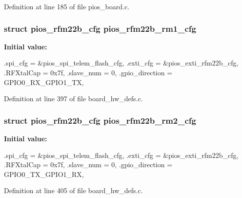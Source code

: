 \-Definition at line 185 of file pios\-\_\-board.\-c.

\hypertarget{group___revo_mini_ga74080000cc730f990607c938f6984f3e}{
\subsubsection[{pios\-\_\-rfm22b\-\_\-rm1\-\_\-cfg}]{\setlength{\rightskip}{0pt plus 5cm}struct {\bf pios\-\_\-rfm22b\-\_\-cfg} {\bf pios\-\_\-rfm22b\-\_\-rm1\-\_\-cfg}}}\label{group___revo_mini_ga74080000cc730f990607c938f6984f3e}
{\bfseries \-Initial value\-:}
\begin{DoxyCode}
 {
        .spi_cfg = &pios_spi_telem_flash_cfg,
        .exti_cfg = &pios_exti_rfm22b_cfg,
        .RFXtalCap = 0x7f,
        .slave_num = 0,
        .gpio_direction = GPIO0_RX_GPIO1_TX,
}
\end{DoxyCode}


\-Definition at line 397 of file board\-\_\-hw\-\_\-defs.\-c.

\hypertarget{group___revo_mini_gacbc9b46e8d0d3813992110ba271f8781}{
\subsubsection[{pios\-\_\-rfm22b\-\_\-rm2\-\_\-cfg}]{\setlength{\rightskip}{0pt plus 5cm}struct {\bf pios\-\_\-rfm22b\-\_\-cfg} {\bf pios\-\_\-rfm22b\-\_\-rm2\-\_\-cfg}}}\label{group___revo_mini_gacbc9b46e8d0d3813992110ba271f8781}
{\bfseries \-Initial value\-:}
\begin{DoxyCode}
 {
        .spi_cfg = &pios_spi_telem_flash_cfg,
        .exti_cfg = &pios_exti_rfm22b_cfg,
        .RFXtalCap = 0x7f,
        .slave_num = 0,
        .gpio_direction = GPIO0_TX_GPIO1_RX,
}
\end{DoxyCode}


\-Definition at line 405 of file board\-\_\-hw\-\_\-defs.\-c.

